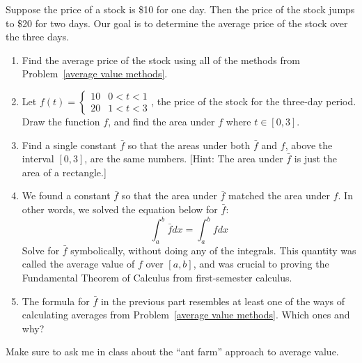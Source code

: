 \begin{problem}
 Suppose the price of a stock is \$10 for one day.  Then the price of the stock jumps to \$20 for two days.  Our goal is to determine the average price of the stock over the three days.
\begin{enumerate}
 \item Find the average price of the stock using all of the methods from Problem~\ref{average value methods}.
 \item Let $f(t) = \begin{cases}10 &0<t<1\\20&1<t<3\end{cases}$, the price of the stock for the three-day period. Draw the function $f$, and find the area under $f$ where $t\in[0,3]$.
 \item Find a single constant $\bar f$ so that the areas under both $\bar f$ and $f$, above the interval $[0,3]$, are the same numbers.  [Hint: The area under $\bar f$ is just the area of a rectangle.]
 \item We found a constant $\bar f$ so that the area under $\bar f$ matched the area under $f$. In other words, we solved the equation below for $\bar f$: 
$$\int_a^b \bar f dx = \int_a^b f dx$$
  Solve for $\bar f$ symbolically, without doing any of the integrals. This quantity was called the average value of $f$ over $[a,b]$, and was crucial to proving the Fundamental Theorem of Calculus from first-semester calculus.
\item {}%
 The formula for $\bar f$ in the previous part resembles at least one of the ways of calculating averages from Problem~\ref{average value methods}.  Which ones and why?
\end{enumerate}
\end{problem}

%
Make sure to ask me in class about the ``ant farm'' approach to average value. 


